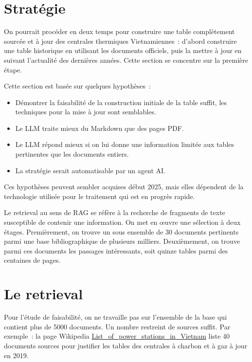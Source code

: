 \documentclass[a4paper,11pt]{report}
\providecommand{\tightlist}{\setlength{\itemsep}{0pt}\setlength{\parskip}{0pt}}
\begin{document}
\section{Stratégie}\label{stratuxe9gie}

On pourrait procéder en deux temps pour construire une table complètement sourcée et à jour des centrales thermiques Vietnamiennes~: d'abord construire une table historique en utilisant les documents officiels, puis la mettre à jour en suivant l'actualité des dernières années. Cette section se concentre sur la première étape.

Cette section est basée sur quelques hypothèses~:

\begin{itemize}
\tightlist
\item
  Démontrer la faisabilité de la construction initiale de la table suffit, les techniques pour la mise à jour sont semblables.
\item
  Le LLM traite mieux du Markdown que des pages PDF.
\item
  Le LLM répond mieux si on lui donne une information limitée aux tables pertinentes que les documents entiers.
\item
  La stratégie serait automatisable par un agent AI.
\end{itemize}

Ces hypothèses peuvent sembler acquises début 2025, mais elles dépendent de la technologie utilisée pour le traitement qui est en progrès rapide.

Le retrieval au sens de RAG se réfère à la recherche de fragments de texte susceptible de contenir une information. On met en œuvre une sélection à deux étages. Premièrement, on trouve un sous ensemble de 30 documents pertinents parmi une base bibliographique de plusieurs milliers. Deuxièmement, on trouve parmi ces documents les passages intéressants, soit quinze tables parmi des centaines de pages.

\section{Le retrieval}\label{le-retrieval}

Pour l'étude de faisabilité, on ne travaille pas sur l'ensemble de la base qui contient plus de 5000 documents. Un nombre restreint de sources suffit. Par exemple~: la page Wikipedia \href{https://en.wikipedia.org/wiki/List_of_power_stations_in_Vietnam}{List\_of\_power\_stations\_in\_Vietnam} liste 40 documents sources pour justifier les tables des centrales à charbon et à gaz à jour en 2019.
\end{document}
